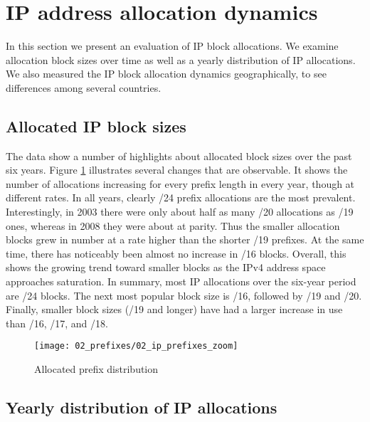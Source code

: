 \section{IP address allocation dynamics}
\label{sec:allocations}

In this section we present an evaluation of IP block allocations. We examine
allocation block sizes over time as well as a yearly distribution of IP
allocations. We also measured the IP block allocation dynamics geographically,
to see differences among several countries.

\subsection{Allocated IP block sizes}

The data show a number of highlights about allocated block sizes over the past
six years. Figure \ref{fig:IP allocations} illustrates several changes that are
observable. It shows the number of allocations increasing for every prefix
length in every year, though at different rates. In all years, clearly /24
prefix allocations are the most prevalent. Interestingly, in 2003 there were
only about half as many /20 allocations as /19 ones, whereas in 2008 they were
about at parity. Thus the smaller allocation blocks grew in number at a rate
higher than the shorter /19 prefixes. At the same time, there has noticeably
been almost no increase in /16 blocks. Overall, this shows the growing trend
toward smaller blocks as the IPv4 address space approaches saturation. In
summary, most IP allocations over the six-year period are /24 blocks. The next
most popular block size is /16, followed by /19 and /20. Finally, smaller block
sizes (/19 and longer) have had a larger increase in use than /16, /17, and
/18.

\begin{figure}[htbp]
 	\centering
 		\texttt{[image: 02\_prefixes/02\_ip\_prefixes\_zoom]}
	\caption{Allocated prefix distribution}
 	\label{fig:IP allocations}
\end{figure}

\subsection{Yearly distribution of IP allocations}


